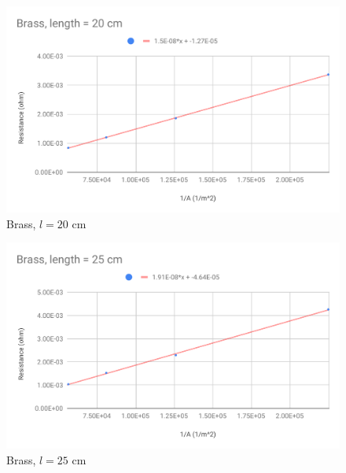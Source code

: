 \begin{figure}[ht]
	\centering
	\includegraphics[scale=0.74]{image/02-resistance/20cm.pdf}
	\caption{Brass, $l = 20$ cm}
	\label{figure.02.20cm}
\end{figure}
\begin{figure}[ht]
	\centering
	\includegraphics[scale=0.74]{image/02-resistance/25cm.pdf}
	\caption{Brass, $l = 25$ cm}
	\label{figure.02.25cm}
\end{figure}
